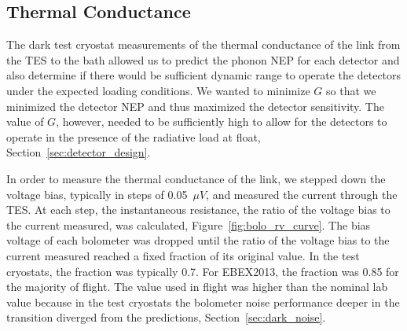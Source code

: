 
\subsection{Thermal Conductance}
\label{sec:thermal_conductance}

The dark test cryostat measurements of the thermal conductance of the link from the \ac{TES} to the bath allowed us to predict the phonon \ac{NEP} for each detector and also determine if there would be sufficient dynamic range to operate the detectors under the expected loading conditions. 
We wanted to minimize $G$ so that we minimized the detector \ac{NEP} and thus maximized the detector sensitivity. 
The value of $G$, however, needed to be sufficiently high to allow for the detectors to operate in the presence of the radiative load at float, Section~\ref{sec:detector_design}. 

In order to measure the thermal conductance of the link, 
we stepped down the voltage bias, typically in steps of 0.05~$\mu V$, and measured the current through the \ac{TES}. 
At each step, the instantaneous resistance, the ratio of the voltage bias to the current measured, was calculated, Figure~\ref{fig:bolo_rv_curve}. 
The bias voltage of each bolometer was dropped until the ratio of the voltage bias to the current measured reached a fixed fraction of its original value.
In the test cryostats, the fraction was typically 0.7. 
For \ac{EBEX2013}, the fraction was 0.85 for the majority of flight.
The value used in flight was higher than the nominal lab value because in the test cryostats the bolometer noise performance deeper in the transition diverged from the predictions, Section~\ref{sec:dark_noise}. 


